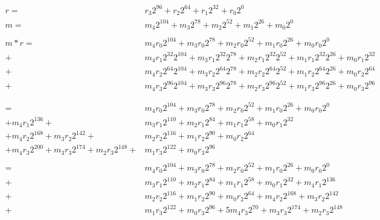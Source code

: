 \documentclass[12pt]{article}
\begin{document}
    \begin{align*}
  r= & r_{3}2^{96} + r_{2}2^{64} + r_{1}2^{32} + r_{0}2^0\\
  m= & m_{4}2^{104} + m_{3}2^{78} + m_{2}2^{52} + m_{1}2^{26} + m_{0}2^0\\
  \\
  m \ast r =
   & m_{4}r_{0}2^{104} + m_{3}r_{0}2^{78} + m_{2}r_{0}2^{52} + m_{1}r_{0}2^{26} + m_{0}r_{0}2^0 \\
 + & m_{4}r_{1}2^{32}2^{104} + m_{3}r_{1}2^{32}2^{78} + m_{2}r_{1}2^{32}2^{52} + m_{1}r_{1}2^{32}2^{26} + m_{0}r_{1}2^{32}  \\
 + & m_{4}r_{2}2^{64}2^{104} + m_{3}r_{2}2^{64}2^{78} + m_{2}r_{2}2^{64}2^{52} + m_{1}r_{2}2^{64}2^{26} + m_{0}r_{2}2^{64} \\
 + & m_{4}r_{3}2^{96}2^{104} + m_{3}r_{3}2^{96}2^{78} + m_{2}r_{3}2^{96}2^{52} + m_{1}r_{3}2^{96}2^{26} + m_{0}r_{3}2^{96} \\
 \\
 \\
 = & m_{4}r_{0}2^{104} +  m_{3}r_{0}2^{78}  +  m_{2}r_{0}2^{52}  +  m_{1}r_{0}2^{26}  + m_{0}r_{0}2^0    \\
 +   m_{4}r_{1}2^{136} +& m_{3}r_{1}2^{110} +  m_{2}r_{1}2^{84}  +  m_{1}r_{1}2^{58}  + m_{0}r_{1}2^{32} \\
 +   m_{4}r_{2}2^{168} +  m_{3}r_{2}2^{142} +& m_{2}r_{2}2^{116} +  m_{1}r_{2}2^{90}  + m_{0}r_{2}2^{64} \\
 +   m_{4}r_{3}2^{200} +  m_{3}r_{3}2^{174} +  m_{2}r_{3}2^{148} +& m_{1}r_{3}2^{122} + m_{0}r_{3}2^{96} \\
 \\
 = & m_{4}r_{0}2^{104} + m_{3}r_{0}2^{78} + m_{2}r_{0}2^{52}  +  m_{1}r_{0}2^{26}  + m_{0}r_{0}2^0    \\
 + & m_{3}r_{1}2^{110} + m_{2}r_{1}2^{84} + m_{1}r_{1}2^{58}  + m_{0}r_{1}2^{32}   + m_{4}r_{1}2^{136} \\
 + & m_{2}r_{2}2^{116} + m_{1}r_{2}2^{90} + m_{0}r_{2}2^{64}  +   m_{4}r_{2}2^{168} +  m_{3}r_{2}2^{142} \\
 + & m_{1}r_{3}2^{122} + m_{0}r_{3}2^{96} + 5m_{4}r_{3}2^{70} +  m_{3}r_{3}2^{174} +  m_{2}r_{3}2^{148}\\
    \end{align*}
\end{document}
